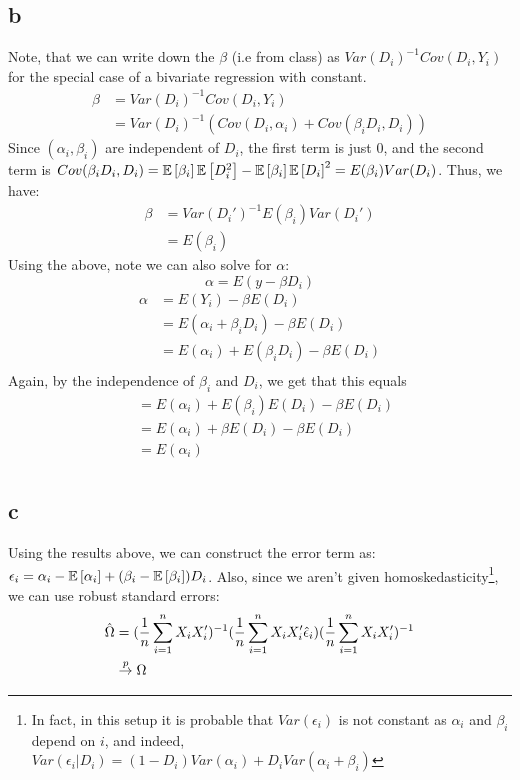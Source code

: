 \documentclass[12pt]{paper}
\begin{document}
\subsection*{b}
Note, that we can write down the $\beta$ (i.e from class) as $Var(D_i)^{-1}Cov(D_i,Y_i)$ for the special case of a bivariate regression with constant. 
\begin{align*}
    \beta &= Var(D_i)^{-1}Cov(D_i,Y_i) \\
    &= Var(D_i)^{-1}(Cov(D_i,\alpha_i) + Cov(\beta_iD_i, D_i)) 
\end{align*}
Since $(\alpha_i,\beta_i)$ are independent of $D_i$, the first term is just 0, and the second term is $Cov(\beta_iD_i, D_i)=\mathbb{E} \left [ \beta_i \right ]\mathbb{E} \left [ D_i^2 \right ]-\mathbb{E} \left [ \beta_i \right ]\mathbb{E} \left [ D_i \right ]^2=E(\beta_i)Var(D_i)$. Thus, we have:
\begin{align*}
   \beta & = Var(D_i')^{-1} E(\beta_i)Var(D_i') \\
    & = E(\beta_i)
\end{align*}
Using the above, note we can also solve for $\alpha$:
$$ \alpha = E(y-\beta D_i)$$
\begin{align*}
    \alpha & = E(Y_i) - \beta E(D_i) \\
    & = E(\alpha_i + \beta_i D_i) - \beta E(D_i) \\
    & = E(\alpha_i) + E(\beta_i D_i) - \beta E(D_i) \\
\end{align*}
Again, by the independence of $\beta_i$ and $D_i$, we get that this equals
\begin{align*}
    & = E(\alpha_i) + E(\beta_i) E(D_i) - \beta E(D_i) \\
    & = E(\alpha_i) + \beta E( D_i) - \beta E(D_i) \\
    & = E(\alpha_i)  \\
\end{align*}
\subsection*{c}
Using the results above, we can construct the error term as: $\epsilon_i=\alpha_i-\mathbb{E} \left [ \alpha_i \right ]+(\beta_i-\mathbb{E} \left [ \beta_i \right ])D_i$. Also, since we aren't given homoskedasticity\footnote{In fact, in this setup it is probable that $Var(\epsilon_i)$ is not constant as $\alpha_i$ and $\beta_i$ depend on $i$, and indeed, $Var(\epsilon_i|D_i) = (1-D_i)Var(\alpha_i) + D_iVar(\alpha_i + \beta_i)$}, we can use robust standard errors:
\begin{align*}
    \hat \Omega &= (\frac{1}{n}\sum_{i=1}^n X_i X_i')^{-1}(\frac{1}{n}\sum_{i=1}^n X_i X_i' \hat \epsilon_i)(\frac{1}{n}\sum_{i=1}^n X_i X_i')^{-1} \\
    & \overset{p}{\to} \Omega
\end{align*}
\end{document}
